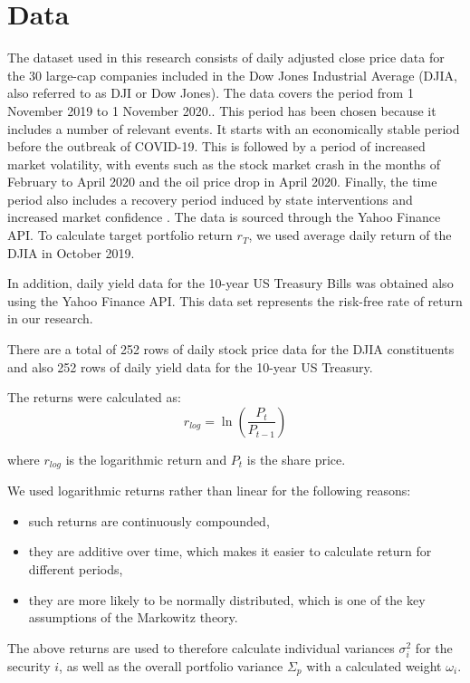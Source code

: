 \documentclass[a4paper,12pt]{article}
\begin{document}
\section{Data \label{data}}
The dataset used in this research consists of daily adjusted close price data for the 30 large-cap companies included in the Dow Jones Industrial Average (DJIA, also referred to as DJI or Dow Jones). The data covers the period from 1 November 2019 to 1 November 2020.. This period has been chosen because it includes a number of relevant events. It starts with an economically stable period before the outbreak of COVID-19. This is followed by a period of increased market volatility, with events such as the stock market crash in the months of February to April 2020 and the oil price drop in April 2020. Finally, the time period also includes a recovery period induced by state interventions and increased market confidence \cite{beer2023covid}. The data is sourced through the Yahoo Finance API. To calculate target portfolio return $r_T$, we used average daily return of the DJIA in October 2019. 

In addition, daily yield data for the 10-year US Treasury Bills was obtained also using the Yahoo Finance API. This data set represents the risk-free rate of return in our research.

There are a total of 252 rows of daily stock price data for the DJIA constituents and also 252 rows of daily yield data for the 10-year US Treasury. 

The returns were calculated as:
\[
    r_{log} = \ln\left(\frac{P_t}{P_{t-1}}\right)
\]

where $r_{log}$ is the logarithmic return and $P_t$ is the share price. 

We used logarithmic returns rather than linear for the following reasons:
\begin{itemize}
    \item such returns are continuously compounded,
    \item they are additive over time, which makes it easier to calculate return for different periods,
    \item they are more likely to be normally distributed, which is one of the key assumptions of the Markowitz theory.
\end{itemize}

The above returns are used to therefore calculate individual variances $\sigma_i^2$ for the security $i$, as well as the overall portfolio variance $\Sigma_p$ with a calculated weight $\omega_i$.  
\end{document}
